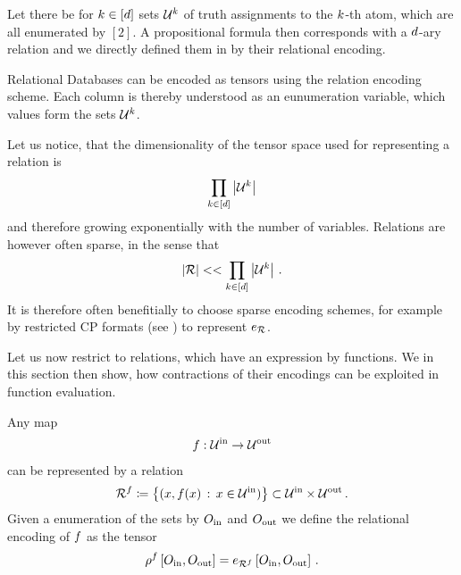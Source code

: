 \begin{example}
	Let there be for $k\in[d]$ sets $\mathcal{U}^{k}$ of truth assignments to the $k$-th atom, which are all enumerated by $[2]$.
	A propositional formula then corresponds with a $d$-ary relation and we directly defined them in  by their relational encoding.
\end{example}

\begin{example}
	Relational Databases can be encoded as tensors using the relation encoding scheme.
	Each column is thereby understood as an eunumeration variable, which values form the sets $\mathcal{U}^{k}$.
\end{example}

Let us notice, that the dimensionality of the tensor space used for representing a relation is
\begin{align*}
	\prod_{k\in[d]} \left|\mathcal{U}^{k}\right|
\end{align*}
and therefore growing exponentially with the number of variables.
Relations are however often sparse, in the sense that
\begin{align*}
	 \left|\mathcal{R}\right| << \prod_{k\in[d]} \left|\mathcal{U}^{k}\right| \, .
\end{align*}
It is therefore often benefitially to choose sparse encoding schemes, for example by restricted CP formats (see ) to represent $e_{\mathcal{R}}$.



Let us now restrict to relations, which have an expression by functions.
We in this section then show, how contractions of their encodings can be exploited in function evaluation.



\begin{definition}\label{def:functionRelationEncoding}
	Any map
	\begin{align*}
		f : \mathcal{U}^{\mathrm{in}} \rightarrow \mathcal{U}^{\mathrm{out}}
	\end{align*}
	can be represented by a relation
	\begin{align*}
		\mathcal{R}^{f} \coloneqq \left\{ (x,f(x) \, : \, x \in\mathcal{U}^{\mathrm{in}} )\right\} \subset \mathcal{U}^{\mathrm{in}} \times \mathcal{U}^{\mathrm{out}} \, .
	\end{align*}
	Given a enumeration of the sets by $O_{\mathrm{in}}$ and $O_{\mathrm{out}}$ we define the relational encoding of $f$ as the tensor
	\begin{align*}
		\rho^{f}\left[O_{\mathrm{in}},O_{\mathrm{out}}\right]
		= e_{\mathcal{R}^{f}}\left[O_{\mathrm{in}},O_{\mathrm{out}}\right]  \, .
	\end{align*}
\end{definition}

